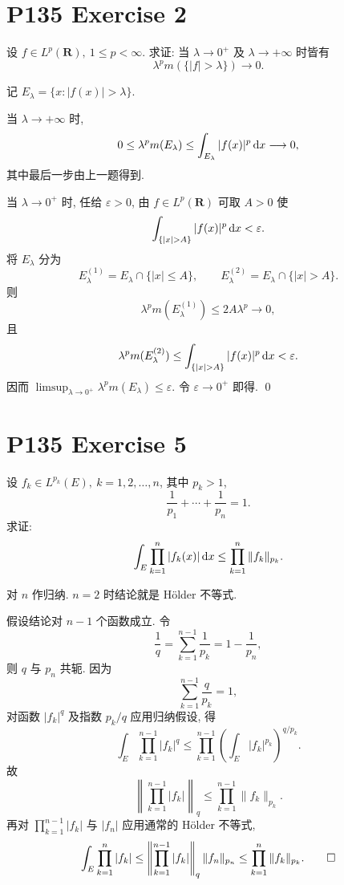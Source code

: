 \documentclass{article}
\begin{document}
\section{P135 Exercise 2}

设 $f\in L^p(\mathbf R),\ 1\le p<\infty$. 求证: 当
$\lambda\to0^+$ 及 $\lambda\to+\infty$ 时皆有
\[
  \lambda^p m(\{|f|>\lambda\})\to0.
\]

\begin{solution}
  记 $E_\lambda=\{x:|f(x)|>\lambda\}$.

  当 $\lambda\to+\infty$ 时,
  \[
    0\le\lambda^p m(E_\lambda)
    \le\int_{E_\lambda}|f(x)|^p\,\mathrm{d} x\longrightarrow0,
  \]
  其中最后一步由上一题得到.

  当 $\lambda\to0^+$ 时, 任给 $\varepsilon>0$, 由 $f\in L^p(\mathbf R)$
  可取 $A>0$ 使
  \[
    \int_{\{|x|>A\}}|f(x)|^p\,\dif x<\varepsilon.
  \]
  将 $E_\lambda$ 分为
  \[
    E_\lambda^{(1)}=E_\lambda\cap\{|x|\le A\},\qquad
    E_\lambda^{(2)}=E_\lambda\cap\{|x|>A\}.
  \]
  则
  \[
    \lambda^p m(E_\lambda^{(1)})\le2A\lambda^p\to0,
  \]
  且
  \[
    \lambda^p m(E_\lambda^{(2)})
    \le\int_{\{|x|>A\}}|f(x)|^p\,\dif x<\varepsilon.
  \]
  因而
  $\limsup_{\lambda\to0^+}\lambda^p m(E_\lambda)\le\varepsilon$.
  令 $\varepsilon\to0^+$ 即得. \qed
\end{solution}

\section{P135 Exercise 5}

设 $f_k\in L^{p_k}(E),\ k=1,2,\ldots,n$, 其中 $p_k>1$,
\[
  \frac1{p_1}+\cdots+\frac1{p_n}=1.
\]
求证:
\[
  \int_E\prod_{k=1}^n|f_k(x)|\,\mathrm{d} x
  \le\prod_{k=1}^n\|f_k\|_{p_k}.
\]

\begin{solution}
  对 $n$ 作归纳. $n=2$ 时结论就是 Hölder 不等式.

  假设结论对 $n-1$ 个函数成立. 令
  \[
    \frac1q=\sum_{k=1}^{n-1}\frac1{p_k}
      =1-\frac1{p_n},
  \]
  则 $q$ 与 $p_n$ 共轭. 因为
  \[
    \sum_{k=1}^{n-1}\frac{q}{p_k}=1,
  \]
  对函数 $|f_k|^q$ 及指数 $p_k/q$ 应用归纳假设, 得
  \[
    \int_E\prod_{k=1}^{n-1}|f_k|^q
    \le\prod_{k=1}^{n-1}
      \left(\int_E|f_k|^{p_k}\right)^{q/p_k}.
  \]
  故
  \[
    \left\|\prod_{k=1}^{n-1}|f_k|\right\|_q
    \le\prod_{k=1}^{n-1}\|f_k\|_{p_k}.
  \]
  再对 $\prod_{k=1}^{n-1}|f_k|$ 与 $|f_n|$ 应用通常的 Hölder 不等式,
  \[
    \int_E\prod_{k=1}^n|f_k|
    \le
    \left\|\prod_{k=1}^{n-1}|f_k|\right\|_q\|f_n\|_{p_n}
    \le\prod_{k=1}^n\|f_k\|_{p_k}.
    \qed
  \]
\end{solution}
\end{document}
